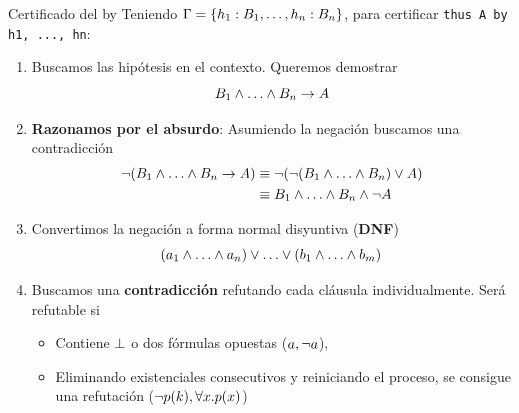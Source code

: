 \documentclass[xcolor={dvipsnames},spanish]{beamer}
\begin{document}
\begin{frame}{Certificado del by}
    Teniendo $\Gamma = \{h_1: B_1, \dots, h_n: B_n\}$, para certificar \lstinline{thus A by h1, ..., hn}:

    \begin{enumerate}
        \item Buscamos las hipótesis en el contexto. Queremos demostrar
        \[
            \formTwo_1 \fAnd \dots \fAnd \formTwo_n \fImp \form
        \]
        \item \textbf{Razonamos por el absurdo}: Asumiendo la negación buscamos una contradicción
        \begin{align*}
            \fNot (\formTwo_1 \fAnd \dots \fAnd \formTwo_n \fImp \form)
            &\equiv \fNot (\fNot (\formTwo_1 \fAnd \dots \fAnd \formTwo_n) \fOr \form)\\
            &\equiv \formTwo_1 \fAnd \dots \fAnd \formTwo_n \fAnd \fNot \form
        \end{align*}
        \item Convertimos la negación a forma normal disyuntiva (\textbf{DNF})
        \[
            (\formLit_{1} \fAnd \dots \fAnd \formLit_n)
            \fOr \dots \fOr
            (\formLitTwo_{1} \fAnd \dots \fAnd \formLitTwo_m)
        \]
        \item Buscamos una \textbf{contradicción} refutando cada cláusula individualmente. Será refutable si
        \begin{itemize}
            \item Contiene $\bot$ o dos fórmulas opuestas ($a, \neg a$), 
            \item Eliminando existenciales consecutivos y reiniciando el proceso, se consigue una refutación ($\neg p(k), \forall x . p(x)$)
        \end{itemize}
    \end{enumerate}
\end{frame}
\end{document}
